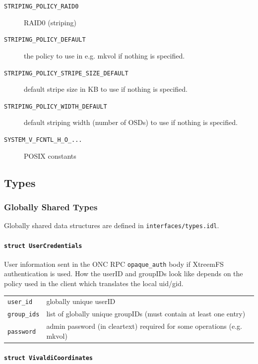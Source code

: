 \begin{description}
	\item[\texttt{STRIPING\_POLICY\_RAID0}] RAID0 (striping)

	\item[\texttt{STRIPING\_POLICY\_DEFAULT}] the policy to use in e.g. mkvol if nothing is specified.

	\item[\texttt{STRIPING\_POLICY\_STRIPE\_SIZE\_DEFAULT}] default stripe size in KB to use if nothing is specified.

	\item[\texttt{STRIPING\_POLICY\_WIDTH\_DEFAULT}] default striping width (number of OSDs) to use if nothing is specified.

	\item[\texttt{SYSTEM\_V\_FCNTL\_H\_O\_...}] POSIX constants

\end{description}

\subsection{Types}

\subsubsection{Globally Shared Types}

Globally shared data structures are defined in \texttt{inter\-faces/types.idl}.

\paragraph{\texttt{struct UserCredentials}}

User information sent in the ONC RPC \texttt{opaque\_auth} body if XtreemFS authentication is used. How the userID and groupIDs look like depends on the policy used in the client which translates the local uid/gid.

\begin{tabularx}{\textwidth}{lX}
 \texttt{user\_id} & globally unique userID\\
 \texttt{group\_ids} & list of globally unique groupIDs (must contain at least one entry)\\
 \texttt{password} & admin password (in cleartext) required for some operations (e.g. mkvol)
\end{tabularx}

\paragraph{\texttt{struct VivaldiCoordinates}}

